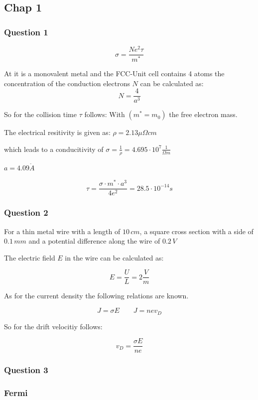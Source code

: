 \subsection{Chap 1 } \label{chap1}

\subsubsection*{Question 1}

\begin{equation}
    \sigma = \frac{N e^2 \tau}{m^*}
\end{equation}


At it is a monovalent metal and the FCC-Unit cell contains 
4 atoms the concentration of the conduction electrons $N$ can be
calculated as:
$$N =\frac{4}{a^3}$$

So for the collision time $\tau$ follows:
With $(m^* = m_0)$ the free electron mass.

The electrical resitivity is given as:
$\rho = 2.13 \mu \Omega cm$

which leads to a conducitivity of
$\sigma = \frac{1}{\rho} = 4.695\cdot 10^7 \frac{1}{\Omega m}$

$a = 4.09 \mathring{A}$

$$\tau =\frac{\sigma \cdot m^* \cdot a^3}{4e^2} = 28.5 \cdot 10^{-14}s$$

\subsubsection*{Question 2}

For a thin metal wire with a length of $10 \, cm$, a square cross section with 
a side of $0.1 \, mm$ and a potential difference along the wire of $0.2 \, V$

The electric field $E$ in the wire can be calculated as: 

$$E = \frac{U}{L} = 2 \frac{V}{m}$$

As for the current density the following relations are known.

$$J = \sigma E \qquad J = nev_D$$

So for the drift velocitiy follows:

$$v_D =  \frac{\sigma E}{n e}$$

\subsubsection*{Question 3}


\subsubsection*{Fermi}

